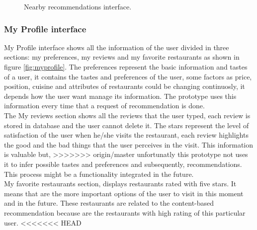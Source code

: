 \begin{figure}
\captionsetup{font=footnotesize}
\centering
{}
\caption{Nearby recommendations interface.}
\label{fig:nearby-recs}   
\end{figure}
\subsubsection{My Profile interface}

My Profile interface shows all the information of the user divided in
three sections: my preferences, my reviews and my favorite restaurants
as shown in figure \ref{fig:myprofile}. The preferences represent the basic
information and tastes of a user, it contains the tastes and preferences
of the user, some factors as price, position, cuisine and attributes
of restaurants could be changing continuosly, it depends how the user
want manage its information. The prototype uses this information every
time that a request of recommendation is done.\\
The My reviews section shows all the reviews that the user typed, each
review is stored in database and the user cannot delete it. The stars
represent the level of satisfaction of the user when he/she visits the
restaurant, each review highlights the good and the bad things that
the user perceives in the visit. This information is valuable but,
>>>>>>> origin/master
unfortunatly this prototype not uses it to infer possible tastes and
preferences and subsequently, recommendations. This process might be a
functionality integrated in the future.\\
My favorite restaurants section, displays restaurants rated with five
stars. It means that are the more important options of the user to
visit in this moment and in the future. These restaurants are related
to the content-based recommendation because are the restaurants with
high rating of this particular user.
<<<<<<< HEAD

